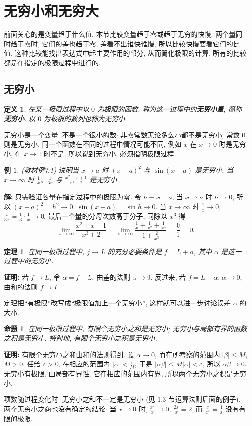 \documentclass[UTF8,openany]{ctexbook}
\theoremstyle{chinesetextbook}
\newtheorem{definition}{定义}[section]
\newtheorem{example}{例}[section]
\newtheorem{proposition}{命题}[section]
\newenvironment{cnproof}{\par\indent\textbf{证明:} \ignorespaces}{\par}
\newenvironment{cnsolution}{\par\indent\textbf{解:} \ignorespaces}{\par}
\newtheorem*{theoremsingle}{定理}
\begin{document}
\section{无穷小和无穷大}
前面关心的是变量趋于什么值, 本节比较变量趋于零或趋于无穷的快慢. 两个量同时趋于零时, 它们的差也趋于零, 差看不出谁快谁慢, 所以比较快慢要看它们的比值. 这种比较能找出表达式中起主要作用的部分, 从而简化极限的计算. 所有的比较都是在指定的极限过程中进行的.
\subsection{无穷小}
\begin{definition}
在某一极限过程中以 $0$ 为极限的函数, 称为这一过程中的\textbf{无穷小量}, 简称\textbf{无穷小}. 以 $0$ 为极限的数列也称为无穷小.
\end{definition}
无穷小是一个变量, 不是一个很小的数: 非零常数无论多么小都不是无穷小, 常数 $0$ 则是无穷小. 同一个函数在不同的过程中情况可能不同, 例如 $x$ 在 $x\to0$ 时是无穷小, 在 $x\to1$ 时不是. 所以说到无穷小, 必须指明极限过程.
\begin{example}
\textnormal{(教材例7.1)} 说明当 $x\to a$ 时 $(x-a)^2$ 与 $\sin(x-a)$ 是无穷小, 当 $x\to\infty$ 时 $\displaystyle\frac1x$、$\displaystyle\frac1{3x}$ 与 $\displaystyle\frac{x^2+x+1}{x^3+2}$ 是无穷小.
\end{example}
\begin{cnsolution}
只需验证各量在指定过程中的极限为零. 令 $h=x-a$, 当 $x\to a$ 时 $h\to0$, 所以 $(x-a)^2=h^2\to0$, $\sin(x-a)=\sin h\to0$. 当 $x\to\infty$ 时 $\displaystyle\frac1x\to0$, $\displaystyle\frac1{3x}=\frac13\cdot\frac1x\to0$. 最后一个量的分母次数高于分子, 同除以 $x^3$ 得
\[
\lim_{x\to\infty}\frac{x^2+x+1}{x^3+2}=\lim_{x\to\infty}\frac{\frac1x+\frac1{x^2}+\frac1{x^3}}{1+\frac2{x^3}}=\frac01=0.
\]
\end{cnsolution}
\begin{theoremsingle}
在同一极限过程中, $f\to L$ 的充分必要条件是 $f=L+\alpha$, 其中 $\alpha$ 是这一过程中的无穷小.
\end{theoremsingle}
\begin{cnproof}
若 $f\to L$, 令 $\alpha=f-L$, 由差的法则 $\alpha\to0$. 反过来, 若 $f=L+\alpha$, $\alpha\to0$, 由和的法则 $f\to L$.
\end{cnproof}
定理把“有极限”改写成“极限值加上一个无穷小”, 这样就可以进一步讨论误差 $\alpha$ 的大小.
\begin{proposition}
在同一极限过程中, 有限个无穷小之和是无穷小; 无穷小与局部有界的函数之积是无穷小. 特别地, 有限个无穷小之积是无穷小.
\end{proposition}
\begin{cnproof}
有限个无穷小之和由和的法则得到. 设 $\alpha\to0$, 而在所考察的范围内 $|\beta|\le M$, $M>0$. 任给 $\varepsilon>0$, 在相应的范围内 $\displaystyle|\alpha|<\frac\varepsilon M$, 于是 $|\alpha\beta|\le M|\alpha|<\varepsilon$, 所以 $\alpha\beta\to0$. 无穷小有极限, 由局部有界性, 它在相应的范围内有界, 所以两个无穷小之积是无穷小.
\end{cnproof}
项数随过程变化时, 无穷小之和不一定是无穷小 (见 1.3 节运算法则后面的例子). 两个无穷小之商也没有确定的结论: 当 $x\to0$ 时, $\displaystyle\frac{x^2}x\to0$, $\displaystyle\frac{2x}x=2$, 而 $\displaystyle\frac x{x^2}=\frac1x$ 没有有限的极限.
\end{document}
